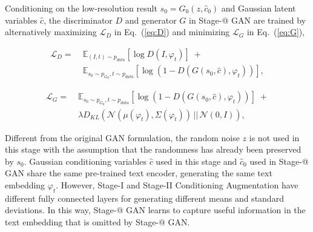 Conditioning on the low-resolution result $s_0 = G_0(z, \hat{c}_0)$ and Gaussian latent variables $\hat{c}$, the discriminator $D$ and generator $G$ in Stage-\expandafter\@slowromancap{}@ GAN are trained by alternatively maximizing $\mathcal{L}_{D}$ in Eq.~(\ref{eq:D}) and minimizing $\mathcal{L}_{G}$ in Eq.~(\ref{eq:G}),

\begin{equation}\label{eq:D}
\begin{aligned}
\mathcal{L}_{D} =  &\; \mathbb{E}_{(I,t) \sim {p_{data}}} [\log D(I, \varphi_{t})] \; + \\
&\; \mathbb{E}_{s_0 \sim {p_{G_0}}, t \sim p_{data}} [\log(1 - D(G(s_0, \hat{c}), \varphi_{t}))],
\end{aligned}
\end{equation}

\begin{equation}\label{eq:G}
\begin{aligned}
\mathcal{L}_{G} = &\; \mathbb{E}_{s_0 \sim {p_{G_0}}, t \sim p_{data}} [\log(1 - D(G(s_0, \hat{c}), \varphi_{t}))] \; + \\
                    &\; \lambda D_{KL}(\mathcal{N}(\mu(\varphi_{t}), \Sigma(\varphi_{t})) \, || \, \mathcal{N}(0, I)), 
\end{aligned}
\end{equation}

Different from the original GAN formulation, the random noise $z$ is not used in this stage with the assumption that the randomness has already been preserved by $s_0$. Gaussian conditioning variables $\hat{c}$ used in this stage and $\hat{c}_0$ used in Stage-\expandafter\@slowromancap{}@ GAN share the same pre-trained text encoder, generating the same text embedding $\varphi_{t}$. 
However, Stage-I and Stage-II Conditioning Augmentation have different fully connected layers for generating different means and standard deviations. In this way, Stage-\expandafter\@slowromancap{}@ GAN learns to capture useful information in the text embedding that is omitted by Stage-\expandafter\@slowromancap{}@ GAN.

